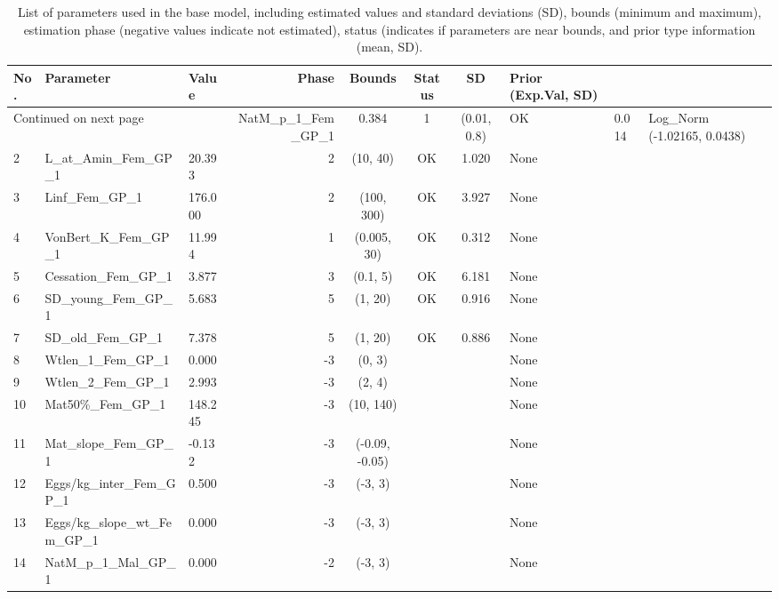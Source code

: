 \documentclass[12pt,]{article}
\begin{document}
\begin{landscape}
\begin{longtable}{lp{2.5in}lrcccl}
\caption{List of parameters used in
                                              the base model, including estimated 
                                              values and standard deviations (SD), 
                                              bounds (minimum and maximum), 
                                              estimation phase (negative values indicate
                                              not estimated), status (indicates if 
                                              parameters are near bounds, and prior type
                                              information (mean, SD).} \\ 
  \hline
No. & Parameter & Value & Phase & Bounds & Status & SD & Prior (Exp.Val, SD)  \\ 
  \hline 
\endhead 
\hline 
\multicolumn{3}{l}{\footnotesize Continued on next page} 
\endfoot 
\endlastfoot 
 \hline
1 & NatM\_p\_1\_Fem\_GP\_1 & 0.384 & 1 & (0.01, 0.8) & OK & 0.014 & Log\_Norm (-1.02165, 0.0438) \\ 
  2 & L\_at\_Amin\_Fem\_GP\_1 & 20.393 & 2 & (10, 40) & OK & 1.020 & None \\ 
  3 & Linf\_Fem\_GP\_1 & 176.000 & 2 & (100, 300) & OK & 3.927 & None \\ 
  4 & VonBert\_K\_Fem\_GP\_1 & 11.994 & 1 & (0.005, 30) & OK & 0.312 & None \\ 
  5 & Cessation\_Fem\_GP\_1 & 3.877 & 3 & (0.1, 5) & OK & 6.181 & None \\ 
  6 & SD\_young\_Fem\_GP\_1 & 5.683 & 5 & (1, 20) & OK & 0.916 & None \\ 
  7 & SD\_old\_Fem\_GP\_1 & 7.378 & 5 & (1, 20) & OK & 0.886 & None \\ 
  8 & Wtlen\_1\_Fem\_GP\_1 & 0.000 & -3 & (0, 3) &  &  & None \\ 
  9 & Wtlen\_2\_Fem\_GP\_1 & 2.993 & -3 & (2, 4) &  &  & None \\ 
  10 & Mat50\%\_Fem\_GP\_1 & 148.245 & -3 & (10, 140) &  &  & None \\ 
  11 & Mat\_slope\_Fem\_GP\_1 & -0.132 & -3 & (-0.09, -0.05) &  &  & None \\ 
  12 & Eggs/kg\_inter\_Fem\_GP\_1 & 0.500 & -3 & (-3, 3) &  &  & None \\ 
  13 & Eggs/kg\_slope\_wt\_Fem\_GP\_1 & 0.000 & -3 & (-3, 3) &  &  & None \\ 
  14 & NatM\_p\_1\_Mal\_GP\_1 & 0.000 & -2 & (-3, 3) &  &  & None \\ 

\end{longtable}
\end{landscape}
\end{document}
